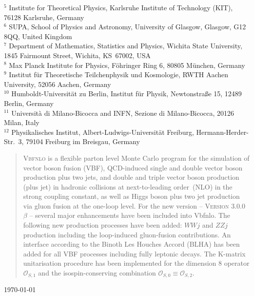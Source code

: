 \documentclass[english,12pt]{article}
\begin{document}
\begin{titlepage}
\begin{center}
$^{5}$ Institute for Theoretical Physics, Karlsruhe Institute of Technology (KIT), 76128 Karlsruhe, Germany \\ \noindent
$^{6}$ SUPA, School of Physics and Astronomy, University of Glasgow, Glasgow, G12 8QQ, United Kingdom \\ \noindent
$^{7}$ Department of Mathematics, Statistics and Physics, Wichita State University, 1845 Fairmount Street, Wichita, KS\ 67002, USA\\ \noindent
$^{8}$ Max Planck Institute for Physics, F\"{o}hringer Ring 6, 80805 M\"{u}nchen, Germany\\ \noindent
$^{9}$ Institut f\"{u}r Theoretische Teilchenphysik und Kosmologie, RWTH Aachen University, 52056 Aachen, Germany  \\ \noindent
$^{10}$ Humboldt-Universit\"{a}t zu Berlin, Institut f\"{u}r Physik, Newtonstra{\ss}e 15, 12489 Berlin, Germany \\ \noindent
$^{11}$ Universit\`a di Milano-Bicocca and INFN, Sezione di Milano-Bicocca, 20126 Milan, Italy\\ \noindent
$^{12}$ Physikalisches Institut, Albert-Ludwigs-Universit\"{a}t Freiburg, Hermann-Herder-Str.\ 3, 79104 Freiburg im Breisgau, Germany \\ \noindent
\noindent
\end{center}
\vspace{0.6cm}

\newpage

\begin{abstract}

\noindent
\textsc{Vbfnlo} is a flexible parton level Monte Carlo program for the
simulation of vector boson fusion (VBF), QCD-induced single and double
vector boson production plus two jets, and double and triple vector
boson production (plus jet) in hadronic collisions at next-to-leading
order~(NLO) in the strong coupling constant, as well as Higgs boson plus
two jet production via gluon fusion at the one-loop level.  For the new
version -- \textsc{Version 3.0.0 $\beta$} -- several major enhancements have
been included into {\sc Vbfnlo}.  The following new production processes have been
added: $WWj$ and $ZZj$ production including the loop-induced gluon-fusion
contributions.
An interface according to the Binoth Les Houches Accord (BLHA) has been added
for all VBF processes including fully leptonic decays.
The K-matrix unitarisation procedure has been implemented for the dimension
8 operator $\mathcal{O}_{S,1}$ and the isospin-conserving combination
$\mathcal{O}_{S,0}\equiv\mathcal{O}_{S,2}$.
\end{abstract}
\vspace{2 cm}
\today
\end{titlepage}
\end{document}
